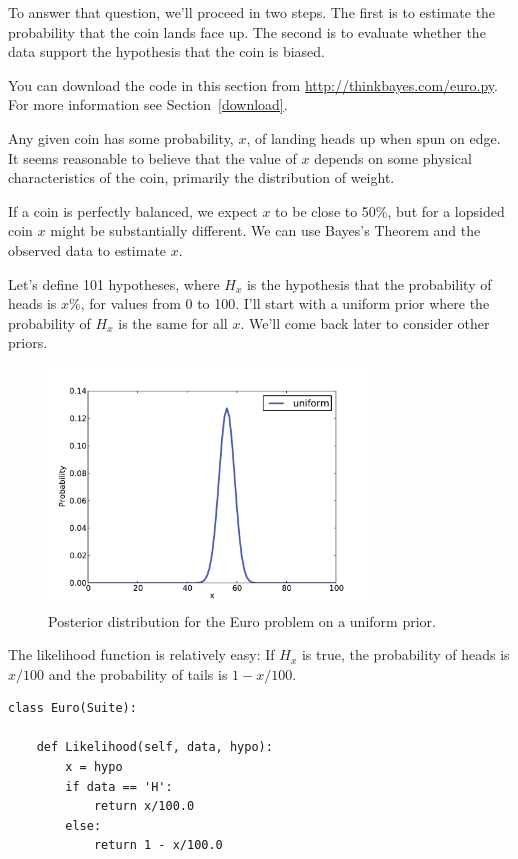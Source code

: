 \documentclass[12pt]{book}
\begin{document}
To answer that question, we'll proceed in two steps.  The first
is to estimate the probability that the coin lands face up.  The second
is to evaluate whether the data support the hypothesis that the
coin is biased.

You can download the code in this section from
\url{http://thinkbayes.com/euro.py}.
  For more information
see Section~\ref{download}.

Any given coin has some probability, $x$, of landing heads up when spun
on edge.  It seems reasonable to believe that the value of $x$ depends
on some physical characteristics of the coin, primarily the distribution
of weight.

If a coin is perfectly balanced, we expect $x$ to be close to 50\%, but
for a lopsided coin $x$ might be substantially different.  We can use
Bayes's Theorem and the observed data to estimate $x$.

Let's define 101 hypotheses, where $H_x$ is the hypothesis that the
probability of heads is $x$\%, for values from 0 to 100.  I'll
start with a uniform prior where the probability of $H_x$ is the same
for all $x$.  We'll come back later to consider other priors.

\begin{figure}
\centerline{\includegraphics[height=2.5in]{figs/euro1.pdf}}
\caption{Posterior distribution for the Euro problem
on a uniform prior.}
\label{fig.euro1}
\end{figure}

The likelihood function is relatively easy: If $H_x$ is true, the
probability of heads is $x/100$ and the probability of tails is $1-
x/100$.

\begin{verbatim}
class Euro(Suite):

    def Likelihood(self, data, hypo):
        x = hypo
        if data == 'H':
            return x/100.0
        else:
            return 1 - x/100.0
\end{verbatim}
\end{document}
